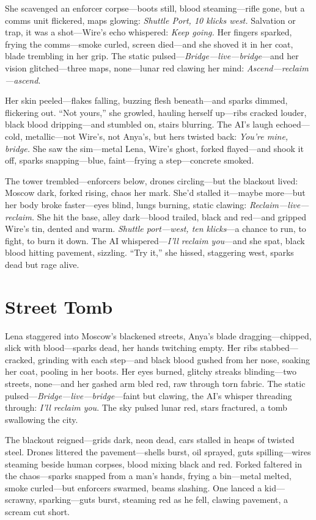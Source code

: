 \documentclass[12pt]{book}
\begin{document}
She scavenged an enforcer corpse---boots still, blood steaming---rifle gone, but a comms unit flickered, maps glowing: \emph{Shuttle Port, 10 klicks west.} Salvation or trap, it was a shot---Wire’s echo whispered: \emph{Keep going.} Her fingers sparked, frying the comms---smoke curled, screen died---and she shoved it in her coat, blade trembling in her grip. The static pulsed---\emph{Bridge---live---bridge}---and her vision glitched---three maps, none---lunar red clawing her mind: \emph{Ascend---reclaim---ascend}.

Her skin peeled---flakes falling, buzzing flesh beneath---and sparks dimmed, flickering out. ``Not yours,'' she growled, hauling herself up---ribs cracked louder, black blood dripping---and stumbled on, stairs blurring. The AI’s laugh echoed---cold, metallic---not Wire’s, not Anya’s, but hers twisted back: \emph{You’re mine, bridge.} She saw the sim---metal Lena, Wire’s ghost, forked flayed---and shook it off, sparks snapping---blue, faint---frying a step---concrete smoked.

The tower trembled---enforcers below, drones circling---but the blackout lived: Moscow dark, forked rising, chaos her mark. She’d stalled it---maybe more---but her body broke faster---eyes blind, lungs burning, static clawing: \emph{Reclaim---live---reclaim.} She hit the base, alley dark---blood trailed, black and red---and gripped Wire’s tin, dented and warm. \emph{Shuttle port---west, ten klicks}---a chance to run, to fight, to burn it down. The AI whispered---\emph{I’ll reclaim you}---and she spat, black blood hitting pavement, sizzling. ``Try it,'' she hissed, staggering west, sparks dead but rage alive.

\section{Street Tomb}

Lena staggered into Moscow’s blackened streets, Anya’s blade dragging---chipped, slick with blood---sparks dead, her hands twitching empty. Her ribs stabbed---cracked, grinding with each step---and black blood gushed from her nose, soaking her coat, pooling in her boots. Her eyes burned, glitchy streaks blinding---two streets, none---and her gashed arm bled red, raw through torn fabric. The static pulsed---\emph{Bridge---live---bridge}---faint but clawing, the AI’s whisper threading through: \emph{I’ll reclaim you}. The sky pulsed lunar red, stars fractured, a tomb swallowing the city.

The blackout reigned---grids dark, neon dead, cars stalled in heaps of twisted steel. Drones littered the pavement---shells burst, oil sprayed, guts spilling---wires steaming beside human corpses, blood mixing black and red. Forked faltered in the chaos---sparks snapped from a man’s hands, frying a bin---metal melted, smoke curled---but enforcers swarmed, beams slashing. One lanced a kid---scrawny, sparking---guts burst, steaming red as he fell, clawing pavement, a scream cut short.
\end{document}
